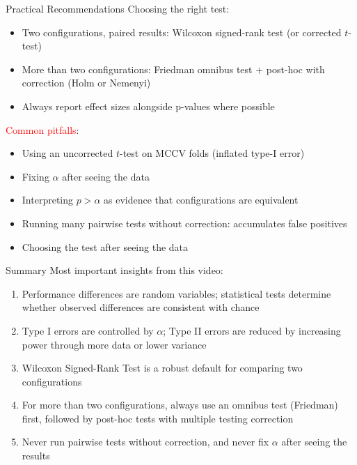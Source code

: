 \documentclass[main]{subfiles}
\begin{document}
\begin{frame}{Practical Recommendations}
\alert{Choosing the right test}:
\begin{itemize}
    \item Two configurations, paired results: Wilcoxon signed-rank test (or corrected $t$-test)
    \item More than two configurations: Friedman omnibus test + post-hoc with correction (Holm or Nemenyi)
    \item Always report effect sizes alongside p-values where possible
\end{itemize}
\textcolor{red}{Common pitfalls}:
\begin{itemize}
    \item Using an uncorrected $t$-test on MCCV folds (inflated type-I error)
    \item Fixing $\alpha$ after seeing the data
    \item Interpreting $p > \alpha$ as evidence that configurations are equivalent
    \item Running many pairwise tests without correction: accumulates false positives
    \item Choosing the test after seeing the data
\end{itemize}
\end{frame}

\begin{frame}{Summary} 
Most important insights from this video:

\begin{enumerate}
    \item Performance differences are random variables; statistical tests determine whether observed differences are consistent with chance
    \item Type I errors are controlled by $\alpha$; Type II errors are reduced by increasing power through more data or lower variance
    \item Wilcoxon Signed-Rank Test is a robust default for comparing two configurations
    \item For more than two configurations, always use an omnibus test (Friedman) first, followed by post-hoc tests with multiple testing correction
    \item Never run pairwise tests without correction, and never fix $\alpha$ after seeing the results
\end{enumerate}

\end{frame}
\end{document}
